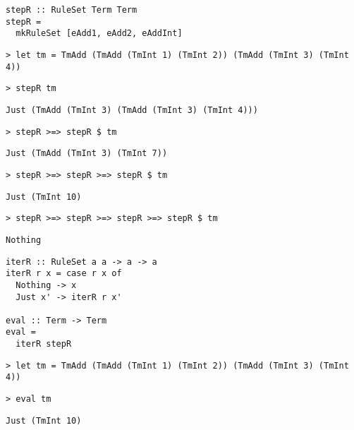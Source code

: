 \begin{frame}[fragile]
  \begin{verbatim}
stepR :: RuleSet Term Term
stepR =
  mkRuleSet [eAdd1, eAdd2, eAddInt]
  \end{verbatim}
\end{frame}

\begin{frame}[fragile]
  \onslide<+->
  \begin{verbatim}
> let tm = TmAdd (TmAdd (TmInt 1) (TmInt 2)) (TmAdd (TmInt 3) (TmInt 4))
  \end{verbatim}
  \onslide<+->
  \begin{verbatim}
> stepR tm
  \end{verbatim}
  \onslide<+->
  \begin{verbatim}
Just (TmAdd (TmInt 3) (TmAdd (TmInt 3) (TmInt 4)))
  \end{verbatim}
  \onslide<+->
  \begin{verbatim}
> stepR >=> stepR $ tm
  \end{verbatim}
  \onslide<+->
  \begin{verbatim}
Just (TmAdd (TmInt 3) (TmInt 7))
  \end{verbatim}
  \onslide<+->
  \begin{verbatim}
> stepR >=> stepR >=> stepR $ tm
  \end{verbatim}
  \onslide<+->
  \begin{verbatim}
Just (TmInt 10)
  \end{verbatim}
  \onslide<+->
  \begin{verbatim}
> stepR >=> stepR >=> stepR >=> stepR $ tm
  \end{verbatim}
  \onslide<+->
  \begin{verbatim}
Nothing
  \end{verbatim}
\end{frame}

\begin{frame}[fragile]
  \begin{verbatim}
iterR :: RuleSet a a -> a -> a
iterR r x = case r x of
  Nothing -> x
  Just x' -> iterR r x'

eval :: Term -> Term
eval =
  iterR stepR
  \end{verbatim}
\end{frame}

\begin{frame}[fragile]
  \onslide<+->
  \begin{verbatim}
> let tm = TmAdd (TmAdd (TmInt 1) (TmInt 2)) (TmAdd (TmInt 3) (TmInt 4))
  \end{verbatim}
  \onslide<+->
  \begin{verbatim}
> eval tm
  \end{verbatim}
  \onslide<+->
  \begin{verbatim}
Just (TmInt 10)
  \end{verbatim}
\end{frame}

